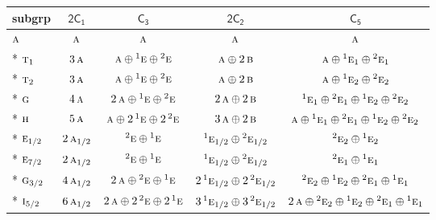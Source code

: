 \documentclass[10pt,a4paper]{article}
\numberwithin{equation}{section}
\newcommand{\grp}[1]{\mathsf{#1}}
\newcommand{\irr}[1]{\text{\normalfont\scshape #1}}
\newcommand{\conjpair}[1]{{}^{#1}}
\begin{document}
{\small\begin{longtable}{@{}lcccc@{}}\toprule
subgrp & \href{2C1.pdf}{$\grp{2C_{1}}$} & \href{C3.pdf}{$\grp{C_{3}}$} & \href{2C2.pdf}{$\grp{2C_{2}}$} & \href{C5.pdf}{$\grp{C_{5}}$}\\\midrule\endhead
\bottomrule\endfoot\endlastfoot
$\irr{a}$ & $\irr{a}$ & $\irr{a}$ & $\irr{a}$ & $\irr{a}$\\*
$\irr{t}_{1}$ & $3\,\irr{a}$ & $\irr{a}\oplus \conjpair{1}\irr{e}\oplus \conjpair{2}\irr{e}$ & $\irr{a}\oplus 2\,\irr{b}$ & $\irr{a}\oplus \conjpair{1}\irr{e}_{1}\oplus \conjpair{2}\irr{e}_{1}$\\*
$\irr{t}_{2}$ & $3\,\irr{a}$ & $\irr{a}\oplus \conjpair{1}\irr{e}\oplus \conjpair{2}\irr{e}$ & $\irr{a}\oplus 2\,\irr{b}$ & $\irr{a}\oplus \conjpair{1}\irr{e}_{2}\oplus \conjpair{2}\irr{e}_{2}$\\*
$\irr{g}$ & $4\,\irr{a}$ & $2\,\irr{a}\oplus \conjpair{1}\irr{e}\oplus \conjpair{2}\irr{e}$ & $2\,\irr{a}\oplus 2\,\irr{b}$ & $\conjpair{1}\irr{e}_{1}\oplus \conjpair{2}\irr{e}_{1}\oplus \conjpair{1}\irr{e}_{2}\oplus \conjpair{2}\irr{e}_{2}$\\*
$\irr{h}$ & $5\,\irr{a}$ & $\irr{a}\oplus 2\,\conjpair{1}\irr{e}\oplus 2\,\conjpair{2}\irr{e}$ & $3\,\irr{a}\oplus 2\,\irr{b}$ & $\irr{a}\oplus \conjpair{1}\irr{e}_{1}\oplus \conjpair{2}\irr{e}_{1}\oplus \conjpair{1}\irr{e}_{2}\oplus \conjpair{2}\irr{e}_{2}$\\*
$\irr{e}_{1/2}$ & $2\,\irr{a}_{1/2}$ & $\conjpair{2}\irr{e}\oplus \conjpair{1}\irr{e}$ & $\conjpair{1}\irr{e}_{1/2}\oplus \conjpair{2}\irr{e}_{1/2}$ & $\conjpair{2}\irr{e}_{2}\oplus \conjpair{1}\irr{e}_{2}$\\*
$\irr{e}_{7/2}$ & $2\,\irr{a}_{1/2}$ & $\conjpair{2}\irr{e}\oplus \conjpair{1}\irr{e}$ & $\conjpair{1}\irr{e}_{1/2}\oplus \conjpair{2}\irr{e}_{1/2}$ & $\conjpair{2}\irr{e}_{1}\oplus \conjpair{1}\irr{e}_{1}$\\*
$\irr{g}_{3/2}$ & $4\,\irr{a}_{1/2}$ & $2\,\irr{a}\oplus \conjpair{2}\irr{e}\oplus \conjpair{1}\irr{e}$ & $2\,\conjpair{1}\irr{e}_{1/2}\oplus 2\,\conjpair{2}\irr{e}_{1/2}$ & $\conjpair{2}\irr{e}_{2}\oplus \conjpair{1}\irr{e}_{2}\oplus \conjpair{2}\irr{e}_{1}\oplus \conjpair{1}\irr{e}_{1}$\\*
$\irr{i}_{5/2}$ & $6\,\irr{a}_{1/2}$ & $2\,\irr{a}\oplus 2\,\conjpair{2}\irr{e}\oplus 2\,\conjpair{1}\irr{e}$ & $3\,\conjpair{1}\irr{e}_{1/2}\oplus 3\,\conjpair{2}\irr{e}_{1/2}$ & $2\,\irr{a}\oplus \conjpair{2}\irr{e}_{2}\oplus \conjpair{1}\irr{e}_{2}\oplus \conjpair{2}\irr{e}_{1}\oplus \conjpair{1}\irr{e}_{1}$\\
\bottomrule\end{longtable}}
\end{document}
